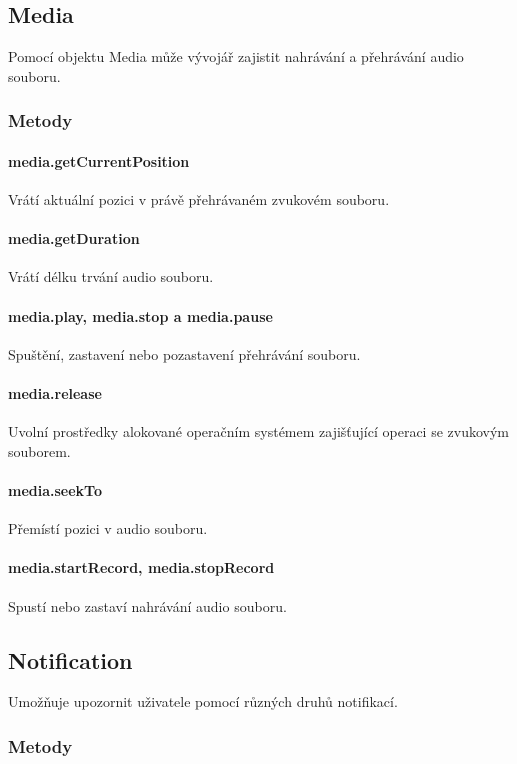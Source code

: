 \subsection{Media}
Pomocí objektu Media může vývojář zajistit nahrávání a přehrávání audio souboru.

\subsubsection{Metody}
\paragraph{media.getCurrentPosition}
Vrátí aktuální pozici v právě přehrávaném zvukovém souboru.

\paragraph{media.getDuration}
Vrátí délku trvání audio souboru.

\paragraph{media.play, media.stop a media.pause}
Spuštění, zastavení nebo pozastavení přehrávání souboru.

\paragraph{media.release}
Uvolní prostředky alokované operačním systémem zajišťující operaci se zvukovým souborem.

\paragraph{media.seekTo}
Přemístí pozici v audio souboru.

\paragraph{media.startRecord, media.stopRecord}
Spustí nebo zastaví nahrávání audio souboru.

\subsection{Notification}
Umožňuje upozornit uživatele pomocí různých druhů notifikací.

\subsubsection{Metody}
